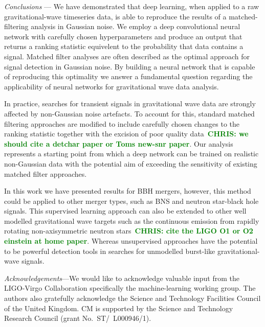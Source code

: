 \documentclass[%
showpacs,
 amsmath,amssymb,
 aps,
 twocolumn,
 prl,
 reprint,
floatfix,
]{revtex4-1}
\newcommand{\chris}[1]{\textbf{\textcolor{green}{CHRIS: #1}}}
\begin{document}
%
%
\textit{Conclusions} --- 
%
%
We have demonstrated that deep learning, when applied to a raw
gravitational-wave timeseries data, is able to reproduce the results of a
matched-filtering analysis in Gaussian noise. We employ a deep convolutional
neural network with carefully chosen hyperparameters and produce an output that
returns a ranking statistic equivelent to the probability that data contains a
signal. Matched filter analyses are often described as the optimal approach for
signal detection in Gaussian noise. By building a neural network that is
capable of reproducing this optimality we answer a fundamental question
regarding the applicability of neural networks for gravitational wave data
analysis. 

%
%
In practice, searches for transient signals in gravitational wave data are
strongly affected by non-Gaussian noise artefacts. To account for this,
standard matched filtering approaches are modified to include carefully chosen
changes to the ranking statistic together with the excision of poor quality
data~\chris{we should cite a detchar paper or Toms new-snr paper}. Our analysis
represents a starting point from which a deep network can be trained on
realistic non-Gaussian data with the potential aim of exceeding the sensitivity
of existing matched filter approaches.

%
%
In this work we have presented results for \ac{BBH} mergers, however, this
method could be applied to other merger types, such as \ac{BNS} and neutron
star-black hole signals. This supervised learning approach can also be extended
to other well modelled gravitational wave targets such as the continuous
emission from rapidly rotating non-axisymmetric neutron stars~\chris{cite the
LIGO O1 or O2 einstein at home paper}. Whereas unsupervised approaches have the
potential to be powerful detection tools in searches for unmodelled burst-like
gravitational-wave signals. 

%
%
\emph{Acknowledgements}---We would like to acknowledge valuable input from the
LIGO-Virgo Collaboration specifically the machine-learning working group. The
authors also gratefully acknowledge the Science and Technology Facilities
Council of the United Kingdom.  CM is supported by the Science and Technology
Research Council (grant No.~ST/~L000946/1).
%




\end{document}
